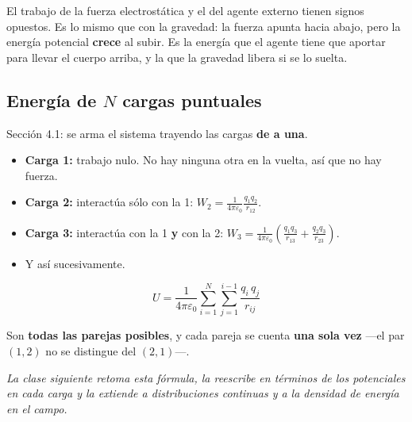 \documentclass[12pt,a4paper]{article}
\begin{document}
\begin{notebox}[El signo]
El trabajo de la fuerza electrostática y el del agente externo tienen signos
opuestos. Es lo mismo que con la gravedad: la fuerza apunta hacia abajo, pero la
energía potencial \textbf{crece} al subir. Es la energía que el agente tiene que
aportar para llevar el cuerpo arriba, y la que la gravedad libera si se lo
suelta.
\end{notebox}

\subsection{Energía de \texorpdfstring{$N$}{N} cargas puntuales}

Sección 4.1: se arma el sistema trayendo las cargas \textbf{de a una}.
\begin{itemize}
  \item \textbf{Carga 1:} trabajo nulo. No hay ninguna otra en la vuelta, así que
    no hay fuerza.
  \item \textbf{Carga 2:} interactúa sólo con la 1:
    $\displaystyle W_2 = \frac{1}{4\pi\varepsilon_0}\frac{q_1 q_2}{r_{12}}$.
  \item \textbf{Carga 3:} interactúa con la 1 \textbf{y} con la 2:
    $\displaystyle W_3 = \frac{1}{4\pi\varepsilon_0}
    \left(\frac{q_1 q_3}{r_{13}} + \frac{q_2 q_3}{r_{23}}\right)$.
  \item Y así sucesivamente.
\end{itemize}

\begin{keybox}
\[
\boxed{\ U = \frac{1}{4\pi\varepsilon_0}
\sum_{i=1}^{N} \sum_{j=1}^{i-1} \frac{q_i\, q_j}{r_{ij}}\ }
\]
\end{keybox}

\begin{warnbox}
Son \textbf{todas las parejas posibles}, y cada pareja se cuenta \textbf{una sola
vez} ---el par $(1,2)$ no se distingue del $(2,1)$---.
\end{warnbox}

\medskip
\noindent\emph{La clase siguiente retoma esta fórmula, la reescribe en términos de
los potenciales en cada carga y la extiende a distribuciones continuas y a la
densidad de energía en el campo.}
\end{document}
